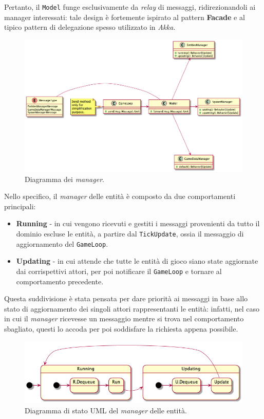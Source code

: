 Pertanto, il \texttt{Model} funge esclusivamente da \textit{relay} di messaggi, ridirezionandoli ai manager interessati:
tale design è fortemente ispirato al pattern \textbf{Facade} \cite{FacadePattern} e al tipico pattern di delegazione
spesso utilizzato in \textit{Akka}.

\begin{figure}[H]
    \centering
    \includegraphics[width=.8\linewidth]{img/class-managers}
    \caption{Diagramma dei \textit{manager}.}
    \label{fig:managers}
\end{figure}

Nello specifico, il \textit{manager} delle entità è composto da due comportamenti principali:
\begin{itemize}
    \item \textbf{Running} - in cui vengono ricevuti e gestiti i messaggi provenienti da tutto il dominio escluse le
    entità, a partire dal \texttt{TickUpdate}, ossia il messaggio di aggiornamento del \texttt{GameLoop}.
    \item \textbf{Updating} - in cui attende che tutte le entità di gioco siano state aggiornate dai corrispettivi
    attori, per poi notificare il \texttt{GameLoop} e tornare al comportamento precedente.
\end{itemize}
Questa suddivisione è stata pensata per dare priorità ai messaggi in base allo stato di aggiornamento dei singoli attori
rappresentanti le entità: infatti, nel caso in cui il \textit{manager} ricevesse un messaggio mentre si trova nel
comportamento sbagliato, questi lo accoda per poi soddisfare la richiesta appena possibile.

\begin{figure}[H]
    \centering
    \includegraphics[width=\linewidth]{img/state-entities-manager}
    \caption{Diagramma di stato UML del \textit{manager} delle entità.}
    \label{fig:entities-manager}
\end{figure}

